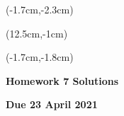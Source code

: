 \documentclass[12pt, oneside]{article}
\begin{document}
\begin{textblock*}{4cm}(-1.7cm,-2.3cm)
\end{textblock*}

\begin{textblock*}{8cm}(12.5cm,-1cm)
\end{textblock*}
\begin{textblock*}{13.5cm}(-1.7cm,-1.8cm)
\end{textblock*}

\vspace{1cm}

\begin{center}
\textbf{\Large Homework 7 Solutions}

\textbf{Due 23 April 2021}
\end{center}
\end{document}
